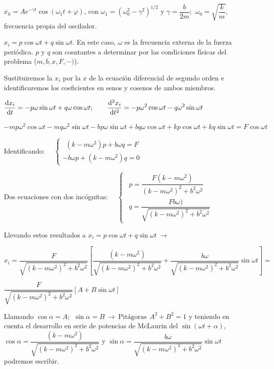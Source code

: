 $x_h=Ae^{-\gamma t}\cos (\omega_1t+\varphi)$, con $\omega_1=(\omega_0^2-\gamma^2)^{1/2} \text{ y } \gamma=\dfrac{b}{2m}$; $\ \omega_0=\sqrt{\dfrac k m}$, frecuencia propia del oscilador.

$x_i=p\cos \omega t + q \sin \omega t$. En este caso, $\omega$ es la frecuencia externa de la fuerza periódica. $p \text{ y } q$ son cosntantes a determinar por las condiciones físicas del problema ($m, b, x, F, \cdots)$).

Sustituiremos la  $x_i$ por la $x$ de la ecuación diferencial de segundo orden e identificaremos los coeficientes en senos y cosenos de ambos miembros.

$\displaystyle \dv{x_i}{t}=-p\omega \sin \omega t +q\omega
\cos \omega t; \qquad \displaystyle \dv[2]{x_i}{t}=-p\omega^2 \cos \omega t - q \omega^2 \sin \omega t$

$-mp\omega^2 \cos \omega t-mq\omega^2 \sin \omega t -bp\omega \sin \omega t +bq\omega \cos \omega t +kp\cos \omega t +kq\sin \omega t=F\cos \omega t$

Identificando: $\quad \begin{cases}
 \ \ (k-m\omega^2)p+b\omega q=F \\ -b\omega p+(k-m\omega^2)q=0	
 \end{cases}$
 
 Dos ecuaciones con dos incógnitas: $\quad \begin{cases}
\ \ p=\dfrac{F(k-m\omega^2)}{(k-m\omega^2)^2+b^2\omega^2} \\ \ \ q=\dfrac{Fb\omega)}{\sqrt{(k-m\omega^2)^2+b^2\omega^2}}	
\end{cases}$

Llevando estos resultados a $x_i=p\cos \omega t + q \sin \omega t \ \to$

\small{$x_i=\dfrac{F}{\sqrt{(k-m\omega^2)^2+b^2\omega^2}} \left[
\dfrac{(k-m\omega^2)}{\sqrt{(k-m\omega^2)^2+b^2\omega^2}}+
\dfrac{b\omega}{\sqrt{(k-m\omega^2)^2+b^2\omega^2}}\sin \omega t
\right]=$}

\normalsize{$\dfrac{F}{\sqrt{(k-m\omega^2)^2+b^2\omega^2}} [A+B\sin \omega t]$}

Llamando $\cos \alpha=A;\ \ \sin \alpha =B \ \to \ \text{Pitágoras} \ \ A^2+B^2=1$ y teniendo en cuenta el desarrollo en serie de potencias de McLaurin del $\sin (\omega t + \alpha)$, \textcolor{gris}{$\cos \alpha=\dfrac{(k-m\omega^2)}{\sqrt{(k-m\omega^2)^2+b^2\omega^2}}$} y \textcolor{gris}{$\sin \alpha=\dfrac{b\omega}{\sqrt{(k-m\omega^2)^2+b^2\omega^2}}\sin \omega t\ $} podremos escribir.

